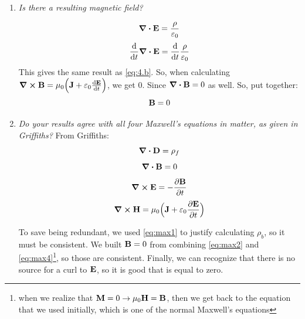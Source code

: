 \documentclass[12pt]{article}
\begin{document}
\begin{enumerate}[label=\alph*)]
\item \emph{Is there a resulting magnetic field?}\bigskip

\[\div{\vb{E}} = \frac{\rho}{\varepsilon_0}\]
\[\dv{t}\div{\vb{E}} = \dv{t}\frac{\rho}{\varepsilon_0}\]
This gives the same result as \ref{eq:4.b}. So, when calculating $\curl{\vb{B}} = \mu_0\Big(\vb{J} + \varepsilon_0 \dv{\vb{E}}{t}\Big)$, we get 0. Since $\div{\vb{B}} = 0$ as well. So, put together:
\[\vb{B} = 0\]
 

\item \emph{Do your results agree with all four Maxwell's equations in matter, as given in Griffiths?}
From Griffiths:
\begin{equation}
\div{\vb{D}} = \rho_f
\label{eq:max1}
\end{equation} 
\begin{equation}
\div{\vb{B}} = 0
\label{eq:max2}
\end{equation} 
\begin{equation}
\curl{\vb{E}} = -\pdv{\vb{B}}{t}
\label{eq:max3}
\end{equation} 
\begin{equation}
\curl{\vb{H}} = \mu_0\Big(\vb{J} + \varepsilon_0 \pdv{\vb{E}}{t}\Big)
\label{eq:max4}
\end{equation} 

To save being redundant, we used \ref{eq:max1} to justify calculating $\rho_b$, so it must be consistent. We built $\vb{B}= 0 $ from combining \ref{eq:max2} and \ref{eq:max4}\footnote{when we realize that $\vb{M} = 0 \rightarrow \mu_0\vb{H} = \vb{B}$, then we get back to the equation that we used initially, which is one of the normal Maxwell's equations}, so those are consistent. Finally, we can recognize that there is no source for a curl to $\vb{E}$, so it is good that is equal to zero.

\end{enumerate}
\end{document}
